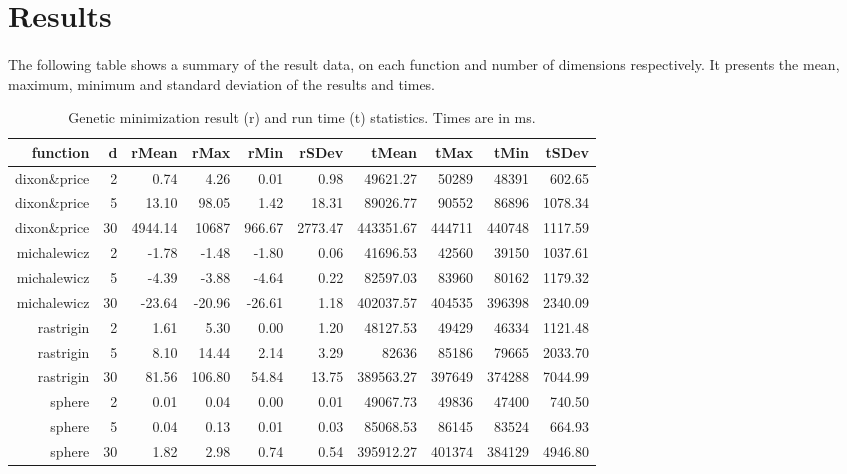 \documentclass{article}
\begin{document}
    \section{Results}
    \paragraph{}
    The following table shows a summary of the result data, on each function and number of dimensions respectively. It presents the mean, maximum, minimum and standard deviation of the results and times.
    
    \newpage
    \begin{table}[ht]
        \centering
        {\footnotesize
        \begin{tabular}{rr|rrrrrrrr}
        function & d & rMean & rMax & rMin & rSDev & tMean & tMax & tMin & tSDev \\ 
        \hline
        dixon\&price & 2 & 0.74 & 4.26 & 0.01 & 0.98 & 49621.27 & 50289 & 48391 & 602.65 \\ 
        dixon\&price & 5 & 13.10 & 98.05 & 1.42 & 18.31 & 89026.77 & 90552 & 86896 & 1078.34 \\ 
        dixon\&price & 30 & 4944.14 & 10687 & 966.67 & 2773.47 & 443351.67 & 444711 & 440748 & 1117.59 \\ 
        michalewicz & 2 & -1.78 & -1.48 & -1.80 & 0.06 & 41696.53 & 42560 & 39150 & 1037.61 \\ 
        michalewicz & 5 & -4.39 & -3.88 & -4.64 & 0.22 & 82597.03 & 83960 & 80162 & 1179.32 \\ 
        michalewicz & 30 & -23.64 & -20.96 & -26.61 & 1.18 & 402037.57 & 404535 & 396398 & 2340.09 \\ 
        rastrigin & 2 & 1.61 & 5.30 & 0.00 & 1.20 & 48127.53 & 49429 & 46334 & 1121.48 \\ 
        rastrigin & 5 & 8.10 & 14.44 & 2.14 & 3.29 & 82636 & 85186 & 79665 & 2033.70 \\ 
        rastrigin & 30 & 81.56 & 106.80 & 54.84 & 13.75 & 389563.27 & 397649 & 374288 & 7044.99 \\ 
        sphere & 2 & 0.01 & 0.04 & 0.00 & 0.01 & 49067.73 & 49836 & 47400 & 740.50 \\ 
        sphere & 5 & 0.04 & 0.13 & 0.01 & 0.03 & 85068.53 & 86145 & 83524 & 664.93 \\ 
        sphere & 30 & 1.82 & 2.98 & 0.74 & 0.54 & 395912.27 & 401374 & 384129 & 4946.80 \\ 
        \end{tabular}
        }
        \caption{Genetic minimization result (r) and run time (t) statistics. Times are in ms.}
    \end{table}
\end{document}
